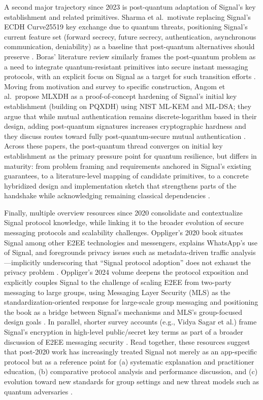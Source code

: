 A second major trajectory since 2023 is post-quantum adaptation of Signal’s key establishment and related primitives. Sharma et al.\ motivate replacing Signal’s ECDH Curve25519 key exchange due to quantum threats, positioning Signal’s current feature set (forward secrecy, future secrecy, authentication, asynchronous communication, deniability) as a baseline that post-quantum alternatives should preserve \cite{sharma2023}. Boras’ literature review similarly frames the post-quantum problem as a need to integrate quantum-resistant primitives into secure instant messaging protocols, with an explicit focus on Signal as a target for such transition efforts \cite{boras2025}. Moving from motivation and survey to specific construction, Angom et al.\ propose MLXDH as a proof-of-concept hardening of Signal’s initial key establishment (building on PQXDH) using NIST ML-KEM and ML-DSA; they argue that while mutual authentication remains discrete-logarithm based in their design, adding post-quantum signatures increases cryptographic hardness and they discuss routes toward fully post-quantum-secure mutual authentication \cite{angom2025}. Across these papers, the post-quantum thread converges on initial key establishment as the primary pressure point for quantum resilience, but differs in maturity: from problem framing and requirements anchored in Signal’s existing guarantees, to a literature-level mapping of candidate primitives, to a concrete hybridized design and implementation sketch that strengthens parts of the handshake while acknowledging remaining classical dependencies \cite{sharma2023,boras2025,angom2025}.

Finally, multiple overview resources since 2020 consolidate and contextualize Signal protocol knowledge, while linking it to the broader evolution of secure messaging protocols and scalability challenges. Oppliger’s 2020 book situates Signal among other E2EE technologies and messengers, explains WhatsApp’s use of Signal, and foregrounds privacy issues such as metadata-driven traffic analysis—implicitly underscoring that “Signal protocol adoption” does not exhaust the privacy problem \cite{oppliger2020}. Oppliger’s 2024 volume deepens the protocol exposition and explicitly couples Signal to the challenge of scaling E2EE from two-party messaging to large groups, using Messaging Layer Security (MLS) as the standardization-oriented response for large-scale group messaging and positioning the book as a bridge between Signal’s mechanisms and MLS’s group-focused design goals \cite{oppliger2024}. In parallel, shorter survey accounts (e.g., Vidya Sagar et al.) frame Signal’s encryption in high-level public/secret key terms as part of a broader discussion of E2EE messaging security \cite{p2023}. Read together, these resources suggest that post-2020 work has increasingly treated Signal not merely as an app-specific protocol but as a reference point for (a) systematic explanation and practitioner education, (b) comparative protocol analysis and performance discussion, and (c) evolution toward new standards for group settings and new threat models such as quantum adversaries \cite{oppliger2020,cao2022,oppliger2024,boras2025}.

